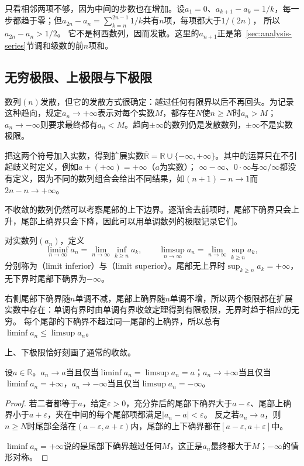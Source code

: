 只看相邻两项不够，因为中间的步数也在增加。设$a_1=0$、$a_{k+1}-a_k=1/k$，每一步都趋于零；但$a_{2n}-a_n=\sum_{k=n}^{2n-1}1/k$共有$n$项，每项都大于$1/(2n)$，
所以$a_{2n}-a_n>1/2$。
它不是柯西数列，因而发散。这里的$a_{n+1}$正是第~\ref{sec:analysis-series}节调和级数的前$n$项和。

\subsection{无穷极限、上极限与下极限}
\label{sec:ru-infinite-limits-limsup}

数列$(n)$发散，但它的发散方式很确定：越过任何有限界以后不再回头。为记录这种趋向，规定$a_n\to+\infty$表示对每个实数$M$，都存在$N$使$n\geq N$时$a_n>M$；
$a_n\to-\infty$则要求最终都有$a_n<M$。趋向$\pm\infty$的数列仍是发散数列，$\pm\infty$不是实数极限。

把这两个符号加入实数，得到扩展实数$\overline{\mathbb R}=\mathbb R\cup\{-\infty,+\infty\}$。其中的运算只在不引起歧义时定义，例如$a+(+\infty)=+\infty$（$a$为实数）；
$\infty-\infty$、$0\cdot\infty$与$\infty/\infty$都没有定义，因为不同的数列组合会给出不同结果，如$(n+1)-n\to1$而$2n-n\to+\infty$。

不收敛的数列仍然可以考察尾部的上下边界。逐渐舍去前项时，尾部下确界只会上升，尾部上确界只会下降，因此可以用单调数列的极限记录它们。
\begin{definition}[上极限与下极限]
\label{def:analysis-liminf-limsup}
对实数列$(a_n)$，定义
\[
 \liminf_{n\to\infty}a_n=\lim_{n\to\infty}\inf_{k\geq n}a_k,\qquad
 \limsup_{n\to\infty}a_n=\lim_{n\to\infty}\sup_{k\geq n}a_k,
\]
分别称为（limit inferior）与（limit superior）。尾部无上界时$\sup_{k\geq n}a_k=+\infty$，无下界时尾部下确界为$-\infty$。
\end{definition}
右侧尾部下确界随$n$单调不减，尾部上确界随$n$单调不增，所以两个极限都在扩展实数中存在：单调有界时由单调有界收敛定理得到有限极限，无界时趋于相应的无穷。
每个尾部的下确界不超过同一尾部的上确界，所以总有$\liminf a_n\leq\limsup a_n$。

上、下极限恰好刻画了通常的收敛。
\begin{theorem}[上下极限与收敛]
\label{thm:ru-limsup-convergence}
设$a\in\mathbb R$。$a_n\to a$当且仅当$\liminf a_n=\limsup a_n=a$；$a_n\to+\infty$当且仅当$\liminf a_n=+\infty$，$a_n\to-\infty$当且仅当$\limsup a_n=-\infty$。
\end{theorem}
\begin{proof}
若二者都等于$a$，给定$\varepsilon>0$，充分靠后的尾部下确界大于$a-\varepsilon$、尾部上确界小于$a+\varepsilon$，夹在中间的每个尾部项都满足$|a_n-a|<\varepsilon$。
反之若$a_n\to a$，则$n\geq N$时尾部全落在$(a-\varepsilon,a+\varepsilon)$内，尾部的上下确界都在$[a-\varepsilon,a+\varepsilon]$中。

$\liminf a_n=+\infty$说的是尾部下确界越过任何$M$，这正是$a_n$最终都大于$M$；$-\infty$的情形对称。
\end{proof}

